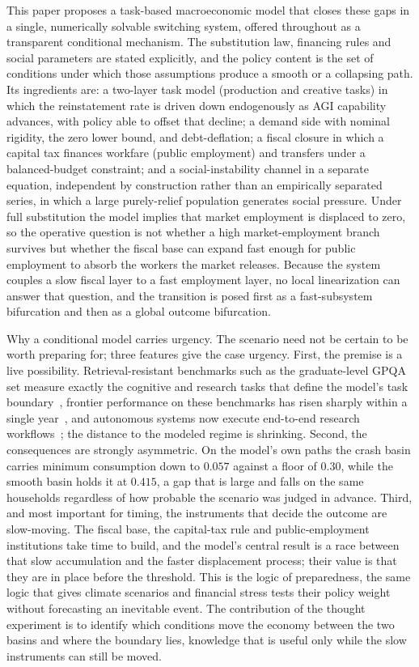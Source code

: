 \documentclass[review,12pt]{elsarticle}
\theoremstyle{plain}
\theoremstyle{definition}
\theoremstyle{remark}
\begin{document}
This paper proposes a task-based macroeconomic model that closes these gaps in a single, numerically solvable switching system, offered throughout as a transparent conditional mechanism. The substitution law, financing rules and social parameters are stated explicitly, and the policy content is the set of conditions under which those assumptions produce a smooth or a collapsing path. Its ingredients are: a two-layer task model (production and creative tasks) in which the reinstatement rate is driven down endogenously as AGI capability advances, with policy able to offset that decline; a demand side with nominal rigidity, the zero lower bound, and debt-deflation; a fiscal closure in which a capital tax finances workfare (public employment) and transfers under a balanced-budget constraint; and a social-instability channel in a separate equation, independent by construction rather than an empirically separated series, in which a large purely-relief population generates social pressure. Under full substitution the model implies that market employment is displaced to zero, so the operative question is not whether a high market-employment branch survives but whether the fiscal base can expand fast enough for public employment to absorb the workers the market releases. Because the system couples a slow fiscal layer to a fast employment layer, no local linearization can answer that question, and the transition is posed first as a fast-subsystem bifurcation and then as a global outcome bifurcation.

Why a conditional model carries urgency. The scenario need not be certain to be worth preparing for; three features give the case urgency. First, the premise is a live possibility. Retrieval-resistant benchmarks such as the graduate-level GPQA set measure exactly the cognitive and research tasks that define the model's task boundary~\cite{Rein2023GPQA}, frontier performance on these benchmarks has risen sharply within a single year~\cite{AIIndex2025}, and autonomous systems now execute end-to-end research workflows~\cite{Lu2026AIScientist}; the distance to the modeled regime is shrinking. Second, the consequences are strongly asymmetric. On the model's own paths the crash basin carries minimum consumption down to $0.057$ against a floor of $0.30$, while the smooth basin holds it at $0.415$, a gap that is large and falls on the same households regardless of how probable the scenario was judged in advance. Third, and most important for timing, the instruments that decide the outcome are slow-moving. The fiscal base, the capital-tax rule and public-employment institutions take time to build, and the model's central result is a race between that slow accumulation and the faster displacement process; their value is that they are in place before the threshold. This is the logic of preparedness, the same logic that gives climate scenarios and financial stress tests their policy weight without forecasting an inevitable event. The contribution of the thought experiment is to identify which conditions move the economy between the two basins and where the boundary lies, knowledge that is useful only while the slow instruments can still be moved.
\end{document}
